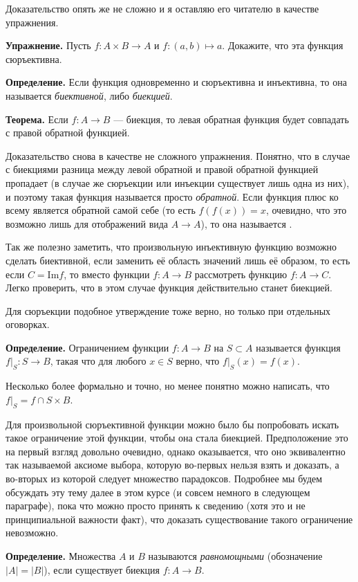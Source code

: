 Доказательство опять же не сложно и я оставляю его читателю в качестве упражнения.

{\bfseries Упражнение.} Пусть $f:A \times B \to A$ и $f: (a, b)\mapsto a$. Докажите, что эта функция сюръективна.

{\bfseries Определение.} Если функция одновременно и сюръективна и инъективна, то она называется {\slshape биективной}, либо {\slshape биекцией}.

{\bfseries Теорема.} Если $f: A\to B$ — биекция, то левая обратная функция будет совпадать с правой обратной функцией.

Доказательство снова в качестве не сложного упражнения. Понятно, что в случае с биекциями разница между левой обратной и правой обратной функцией пропадает (в случае же сюръекции или инъекции существует лишь одна из них), и поэтому такая функция называется просто {\slshape обратной}. Если функция плюс ко всему является обратной самой себе (то есть $f(f(x)) = x$, очевидно, что это возможно лишь для отображений вида $A\to A$), то она называется .

Так же полезно заметить, что произвольную инъективную функцию возможно сделать биективной, если заменить её область значений лишь её образом, то есть если $C = \mathrm{Im} f$, то вместо функции $f: A\to B$ рассмотреть функцию $f: A \to C$. Легко проверить, что в этом случае функция действительно станет биекцией.

Для сюръекции подобное утверждение тоже верно, но только при отдельных оговорках.

{\bfseries Определение.} Ограничением функции $f: A\to B$ на $S\subset A$ называется функция $f|_S: S\to B$, такая что для любого $x\in S$ верно, что $f|_S(x) = f(x)$.

Несколько более формально и точно, но менее понятно можно написать, что $f|_S = f \cap S \times B$.

Для произвольной сюръективной функции можно было бы попробовать искать такое ограничение этой функции, чтобы она стала биекцией. Предположение это на первый взгляд довольно очевидно, однако оказывается, что оно эквивалентно так называемой аксиоме выбора, которую во-первых нельзя взять и доказать, а во-вторых из которой следует множество парадоксов. Подробнее мы будем обсуждать эту тему далее в этом курсе (и совсем немного в следующем параграфе), пока что можно просто принять к сведению (хотя это и не принципиальной важности факт), что доказать существование такого ограничение невозможно.

{\bfseries Определение.} Множества $A$ и $B$ называются {\slshape равномощными} (обозначение $|A| = |B|$), если существует биекция $f: A\to B$.

